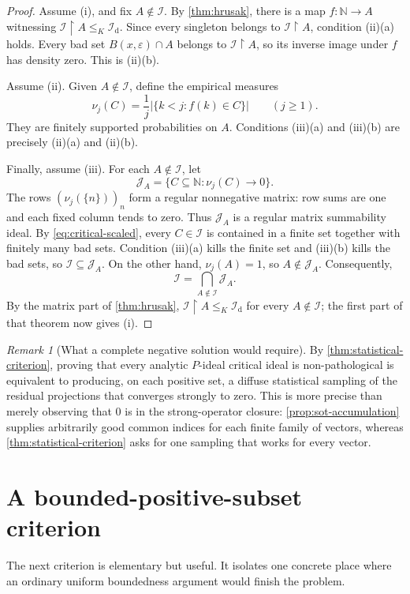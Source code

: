 \documentclass[11pt]{article}
\theoremstyle{definition}
\theoremstyle{remark}
\newtheorem{remark}[theorem]{Remark}
\newcommand{\N}{\mathbb N}
\newcommand{\I}{\mathcal I}
\newcommand{\J}{\mathcal J}
\newcommand{\Id}{\mathcal I_{\mathrm d}}
\newcommand{\restr}{\mathbin{\upharpoonright}}
\newcommand{\eps}{\varepsilon}
\begin{document}
\begin{proof}
Assume (i), and fix $A\notin\I$.  By \cref{thm:hrusak}, there is a map
$f:\N\to A$ witnessing $\I\restr A\leq_K\Id$.  Since every singleton belongs
to $\I\restr A$, condition (ii)(a) holds.  Every bad set
$B(x,\eps)\cap A$ belongs to $\I\restr A$, so its inverse image under $f$ has
density zero.  This is (ii)(b).

Assume (ii).  Given $A\notin\I$, define the empirical measures
\[
 \nu_j(C)=\frac{1}{j}\bigl|\{k<j:f(k)\in C\}\bigr|
 \qquad(j\geq1).
\]
They are finitely supported probabilities on $A$.  Conditions (iii)(a) and
(iii)(b) are precisely (ii)(a) and (ii)(b).

Finally, assume (iii).  For each $A\notin\I$, let
\[
 \J_A=\{C\subseteq\N:\nu_j(C)\to0\}.
\]
The rows $(\nu_j(\{n\}))_n$ form a regular nonnegative matrix: row sums are
one and each fixed column tends to zero.  Thus $\J_A$ is a regular matrix
summability ideal.  By \eqref{eq:critical-scaled}, every $C\in\I$ is contained
in a finite set together with finitely many bad sets.  Condition (iii)(a)
kills the finite set and (iii)(b) kills the bad sets, so $\I\subseteq\J_A$.
On the other hand, $\nu_j(A)=1$, so $A\notin\J_A$.  Consequently,
\[
 \I=\bigcap_{A\notin\I}\J_A.
\]
By the matrix part of \cref{thm:hrusak}, $\I\restr A\leq_K\Id$ for every
$A\notin\I$; the first part of that theorem now gives (i).
\end{proof}

\begin{remark}[What a complete negative solution would require]
By \cref{thm:statistical-criterion}, proving that every analytic $P$-ideal
critical ideal is non-pathological is equivalent to producing, on each
positive set, a diffuse statistical sampling of the residual projections that
converges strongly to zero.  This is more precise than merely observing that
$0$ is in the strong-operator closure: \cref{prop:sot-accumulation} supplies
arbitrarily good common indices for each finite family of vectors, whereas
\cref{thm:statistical-criterion} asks for one sampling that works for every
vector.
\end{remark}

\section{A bounded-positive-subset criterion}

The next criterion is elementary but useful.  It isolates one concrete place
where an ordinary uniform boundedness argument would finish the problem.
\end{document}
